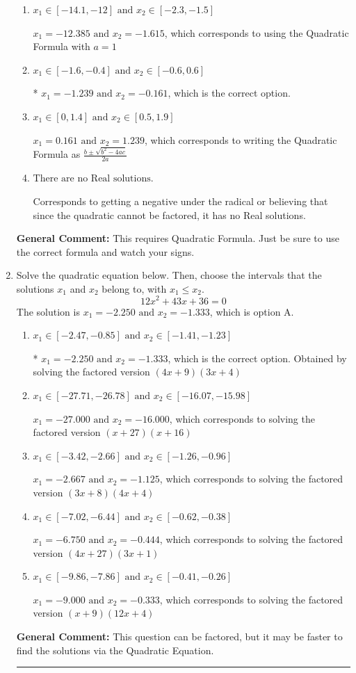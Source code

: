 \documentclass{extbook}[14pt]
\newcommand{\litem}[1]{\item #1

\rule{\textwidth}{0.4pt}}
\begin{document}
\begin{enumerate}
{\begin{enumerate}[label=\Alph*.]
 $x_1 = -11.470 \text{ and } x_2 = 10.070$, which corresponds to writing the Quadratic Formula as $-\frac{b}{2a} \pm \sqrt{b^2 - 4ac}$.
\item \( x_1 \in [-14.1, -12] \text{ and } x_2 \in [-2.3, -1.5] \)

 $x_1 = -12.385 \text{ and } x_2 = -1.615$, which corresponds to using the Quadratic Formula with $a=1$
\item \( x_1 \in [-1.6, -0.4] \text{ and } x_2 \in [-0.6, 0.6] \)

* $x_1 = -1.239 \text{ and } x_2 = -0.161$, which is the correct option.
\item \( x_1 \in [0, 1.4] \text{ and } x_2 \in [0.5, 1.9] \)

 $x_1 = 0.161 \text{ and } x_2 = 1.239$, which corresponds to writing the Quadratic Formula as $\frac{b \pm \sqrt{b^2 - 4ac}}{2a}$
\item \( \text{There are no Real solutions.} \)

Corresponds to getting a negative under the radical or believing that since the quadratic cannot be factored, it has no Real solutions.
\end{enumerate}

\textbf{General Comment:} This requires Quadratic Formula. Just be sure to use the correct formula and watch your signs.
}
\litem{
Solve the quadratic equation below. Then, choose the intervals that the solutions $x_1$ and $x_2$ belong to, with $x_1 \leq x_2$.
\[ 12x^{2} +43 x + 36 = 0 \]The solution is \( x_1 = -2.250 \text{ and } x_2 = -1.333 \), which is option A.\begin{enumerate}[label=\Alph*.]
\item \( x_1 \in [-2.47, -0.85] \text{ and } x_2 \in [-1.41, -1.23] \)

* $x_1 = -2.250 \text{ and } x_2 = -1.333$, which is the correct option. Obtained by solving the factored version $(4x + 9)(3x + 4)$
\item \( x_1 \in [-27.71, -26.78] \text{ and } x_2 \in [-16.07, -15.98] \)

$x_1 = -27.000 \text{ and } x_2 = -16.000$, which corresponds to solving the factored version $(x + 27)(x + 16)$
\item \( x_1 \in [-3.42, -2.66] \text{ and } x_2 \in [-1.26, -0.96] \)

$x_1 = -2.667 \text{ and } x_2 = -1.125$, which corresponds to solving the factored version $(3x + 8)(4x + 4)$
\item \( x_1 \in [-7.02, -6.44] \text{ and } x_2 \in [-0.62, -0.38] \)

$x_1 = -6.750 \text{ and } x_2 = -0.444$, which corresponds to solving the factored version $(4x + 27)(3x + 1)$
\item \( x_1 \in [-9.86, -7.86] \text{ and } x_2 \in [-0.41, -0.26] \)

$x_1 = -9.000 \text{ and } x_2 = -0.333$, which corresponds to solving the factored version $(x + 9)(12x + 4)$
\end{enumerate}

\textbf{General Comment:} This question can be factored, but it may be faster to find the solutions via the Quadratic Equation.
}
\end{enumerate}
\end{document}
